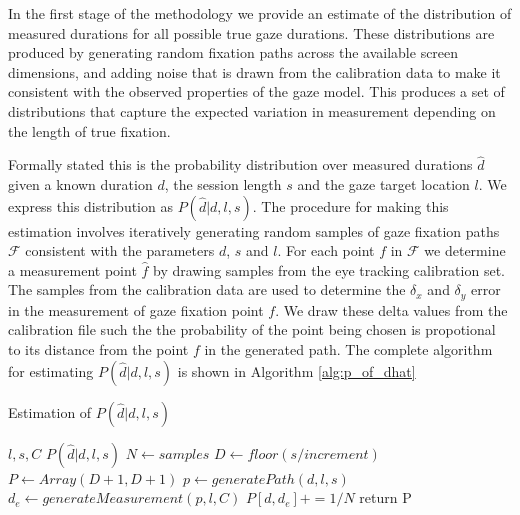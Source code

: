\documentclass[12pt,a4paper]{article}
\numberwithin{equation}{section}
\begin{document}
In the first stage of the methodology we provide an estimate of the distribution of measured
durations for all possible true gaze durations. These distributions are produced by generating
random fixation paths across the available screen dimensions, and adding noise that is 
drawn from the calibration data to make it consistent with the observed properties of the gaze model.
This produces a set of distributions that capture the expected
variation in measurement depending on the length of true fixation.

Formally stated this is the probability distribution over measured durations $\hat{d}$ given a
known duration $d$, the session length $s$ and the gaze target location $l$. 
We express this distribution as $P(\hat{d}|d,l,s)$. The
procedure for making this estimation involves iteratively generating random samples
of gaze fixation paths $\mathcal{F}$ consistent with the parameters $d$, $s$ and $l$. 
For each point $f$ in $\mathcal{F}$ we determine a measurement point $\hat{f}$ 
by drawing samples from the eye tracking calibration set. 
The samples from the calibration data are used to determine the $\delta_x$ and $\delta_y$ 
error in the measurement of gaze fixation point $f$. 
We draw these delta values from the calibration file such the
the probability of the point being chosen is propotional to its distance from the point $f$
in the generated path. The complete algorithm
for estimating $P(\hat{d}|d,l,s)$ is shown in Algorithm \ref{alg:p_of_dhat}    

\begin{algorithm}
\caption{Estimation of $P(\hat{d}|d,l,s)$}\label{alg:p_of_dhat}
\begin{algorithmic}
  \Require $l,s,C$
  \Ensure $P(\hat{d}|d,l,s)$
  \State $N \gets samples$              
  \State $D \gets floor(s / increment)$ 
  \State $P \gets Array(D+1,D+1)$       
                    
                    
      \State $p \gets generatePath(d,l,s)$
      \State $d_e \gets generateMeasurement(p,l,C)$  
      \State $P[d,d_e] += 1/N$          
    \EndFor
  \EndFor
  \State return P
\end{algorithmic}
\end{algorithm}
\end{document}
